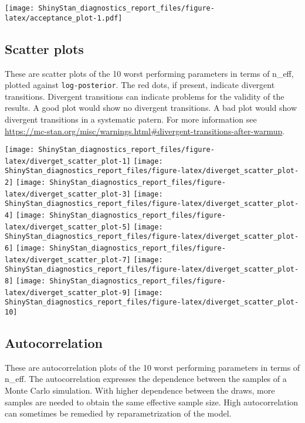 \documentclass[11pt,]{article}
\begin{document}
\texttt{[image: ShinyStan\_diagnostics\_report\_files/figure-latex/acceptance\_plot-1.pdf]}

\newpage

\hypertarget{scatter-plots}{%
\subsection{Scatter plots}\label{scatter-plots}}

These are scatter plots of the 10 worst performing parameters in terms
of n\_eff, plotted against \texttt{log-posterior}. The red dots, if
present, indicate divergent transitions. Divergent transitions can
indicate problems for the validity of the results. A good plot would
show no divergent transitions. A bad plot would show divergent
transitions in a systematic patern. For more information see
\url{https://mc-stan.org/misc/warnings.html\#divergent-transitions-after-warmup}.

\texttt{[image: ShinyStan\_diagnostics\_report\_files/figure-latex/diverget\_scatter\_plot-1]}
\texttt{[image: ShinyStan\_diagnostics\_report\_files/figure-latex/diverget\_scatter\_plot-2]}
\texttt{[image: ShinyStan\_diagnostics\_report\_files/figure-latex/diverget\_scatter\_plot-3]}
\texttt{[image: ShinyStan\_diagnostics\_report\_files/figure-latex/diverget\_scatter\_plot-4]}
\texttt{[image: ShinyStan\_diagnostics\_report\_files/figure-latex/diverget\_scatter\_plot-5]}
\texttt{[image: ShinyStan\_diagnostics\_report\_files/figure-latex/diverget\_scatter\_plot-6]}
\texttt{[image: ShinyStan\_diagnostics\_report\_files/figure-latex/diverget\_scatter\_plot-7]}
\texttt{[image: ShinyStan\_diagnostics\_report\_files/figure-latex/diverget\_scatter\_plot-8]}
\texttt{[image: ShinyStan\_diagnostics\_report\_files/figure-latex/diverget\_scatter\_plot-9]}
\texttt{[image: ShinyStan\_diagnostics\_report\_files/figure-latex/diverget\_scatter\_plot-10]}

\newpage

\hypertarget{autocorrelation}{%
\subsection{Autocorrelation}\label{autocorrelation}}

These are autocorrelation plots of the 10 worst performing parameters in
terms of n\_eff. The autocorrelation expresses the dependence between
the samples of a Monte Carlo simulation. With higher dependence between
the draws, more samples are needed to obtain the same effective sample
size. High autocorrelation can sometimes be remedied by
reparametrization of the model.
\end{document}
